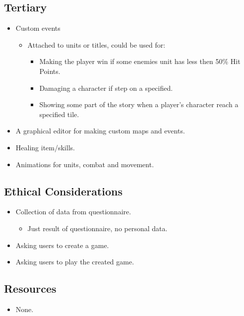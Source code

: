 \subsection{Tertiary} 
\label{tertiary}
\begin{itemize}
	\item Custom events
	\begin{itemize}
		\item Attached to units or titles, could be used for:
		\begin{itemize}
			\item Making the player win if some enemies unit has less then 50\% Hit Points.
			
			\item Damaging a character if step on a specified.
			
			\item Showing some part of the story when a player's character reach a specified tile.
		\end{itemize}
	\end{itemize}
	
	\item A graphical editor for making custom maps and events.
	
	\item Healing item\slash skills.
	
	\item Animations for units, combat and movement.
\end{itemize}

\subsection{Ethical Considerations} 
\label{ethicalconsiderations}
\begin{itemize}
	
	\item Collection of data from questionnaire.
	\begin{itemize}
		\item Just result of questionnaire, no personal data.
	\end{itemize}
	
	\item Asking users to create a game.
	
	\item Asking users to play the created game.
\end{itemize}

\subsection{Resources} 
\label{resources}
\begin{itemize}
	\item None.
\end{itemize}



